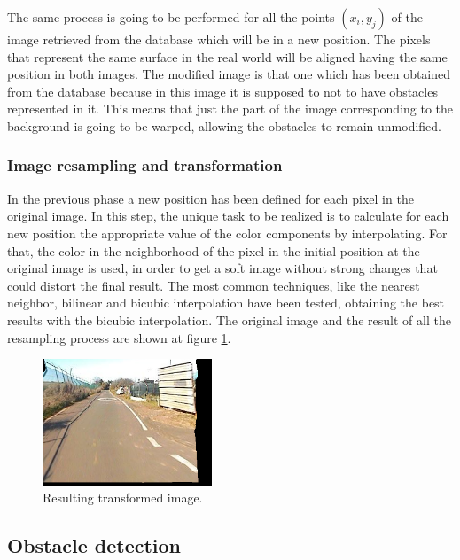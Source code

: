 The same process is going to be performed for all the points $(x_i, y_j)$ of the image retrieved from the database which will be in a new position. The pixels that represent the same surface in the real world will be aligned having the same position in both images. The modified image is that one which has been obtained from the database because in this image it is supposed to not to have obstacles represented in it. This means that just the part of the image corresponding to the background is going to be warped, allowing the obstacles to remain unmodified.

\subsubsection{Image resampling and transformation}\label{ch:chapter01_01_02_04}

In the previous phase a new position has been defined for each pixel in the original image. In this step, the unique task to be realized is to calculate for each new position the appropriate value of the color components by interpolating. For that, the color in the neighborhood of the pixel in the initial position at the original image is used, in order to get a soft image without strong changes that could distort the final result. The most common techniques, like the nearest neighbor, bilinear and bicubic interpolation have been tested, obtaining the best results with the bicubic interpolation. The original image and the result of all the resampling process are shown at figure \ref{fig:cp01_transform_and_resample}.

\begin{figure}[h!]
\centering
\includegraphics[width=0.45\textwidth]{transformed}
\caption{Resulting transformed image.}\label{fig:cp01_transform_and_resample}
\end{figure}

\subsection{Obstacle detection}\label{ch:chapter01_01_03}

